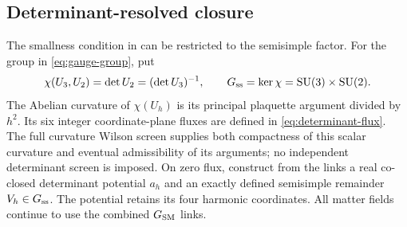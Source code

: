 \documentclass[11pt]{article}
\numberwithin{equation}{section}
\theoremstyle{definition}
\theoremstyle{remark}
\newcommand{\SU}{\mathrm{SU}}
\begin{document}
\subsection{Determinant-resolved closure}
\label{subsec:determinant-closure}

The smallness condition in  can be
restricted to the semisimple factor.  For the group in
\eqref{eq:gauge-group}, put
\begin{equation}
 \chi(U_3,U_2)=\det U_2=(\det U_3)^{-1},\qquad
 G_{\rm ss}=\ker\chi=\SU(3)\times\SU(2).
 \label{eq:determinant-character}
\end{equation}
The Abelian curvature of $\chi(U_h)$ is its principal plaquette argument
divided by $h^2$.  Its six integer coordinate-plane fluxes are defined in
\eqref{eq:determinant-flux}.  The full curvature Wilson screen supplies
both compactness of this scalar curvature and eventual admissibility of
its arguments; no independent determinant screen is imposed.  On zero flux,
construct from the links a real co-closed determinant potential $a_h$ and
an exactly defined semisimple remainder $V_h\in G_{\rm ss}$.  The potential
retains its four harmonic coordinates.  All matter fields continue to use
the combined $G_{\rm SM}$ links.
\end{document}
